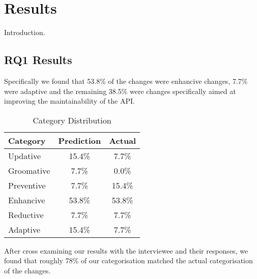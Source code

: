\documentclass{sig-alternate}
\begin{document}


\section{Results} \label{results}
Introduction.


\subsection{RQ1 Results}



Specifically we found that 53.8\% of the changes were enhancive changes, 7.7\% were adaptive and the remaining 38.5\% were changes specifically aimed at improving the maintainability of the API.

\begin{table}
       \centering
       \begin{tabular}[Ht]{|l|c|c|}
       \hline
       \textbf{Category} & \textbf{Prediction} & \textbf{Actual} \\
       \hline
       Updative & 15.4\% & 7.7\% \\
       \hline
       Groomative & 7.7\% & 0.0\% \\
       \hline
       Preventive & 7.7\% & 15.4\% \\
       \hline
       Enhancive & 53.8\% & 53.8\% \\
       \hline
       Reductive & 7.7\% & 7.7\% \\
       \hline
       Adaptive & 15.4\% & 7.7\% \\
       \hline
       \end{tabular}
       \caption{Category Distribution}
       \label{table:Categories}
\end{table}

After cross examining our results with the interviewee and their responses, we found that roughly 78\% of our categorisation matched the actual categorisation of the changes.

\end{document}

